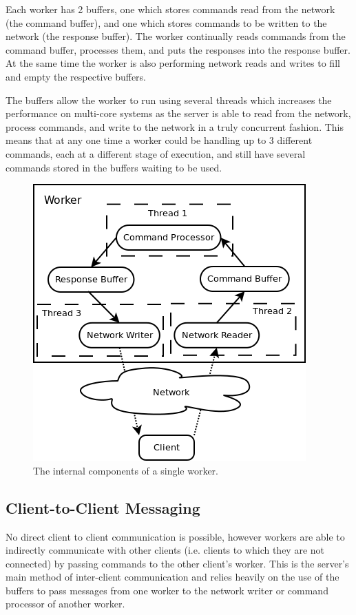 Each worker has 2 buffers, one which stores commands read from the network (the command buffer), and one which stores commands to be written to the network (the response buffer). The worker continually reads commands from the command buffer, processes them, and puts the responses into the response buffer. At the same time the worker is also performing network reads and writes to fill and empty the respective buffers.

The buffers allow the worker to run using several threads which increases the performance on multi-core systems as the server is able to read from the network, process commands, and write to the network in a truly concurrent fashion. This means that at any one time a worker could be handling up to 3 different commands, each at a different stage of execution, and still have several commands stored in the buffers waiting to be used.

\begin{figure}[!h]
    \begin{center}
        \includegraphics[scale=0.6]{Design/diagrams/worker_detail.png}
        \caption{The internal components of a single worker.}
        \label{WorkerDatailedDia}
    \end{center}
\end{figure}

\subsection{Client-to-Client Messaging}
\label{c2c}
No direct client to client communication is possible, however workers are able to indirectly communicate with other clients (i.e. clients to which they are not connected) by passing commands to the other client's worker. This is the server's main method of inter-client communication and relies heavily on the use of the buffers to pass messages from one worker to the network writer or command processor of another worker.

